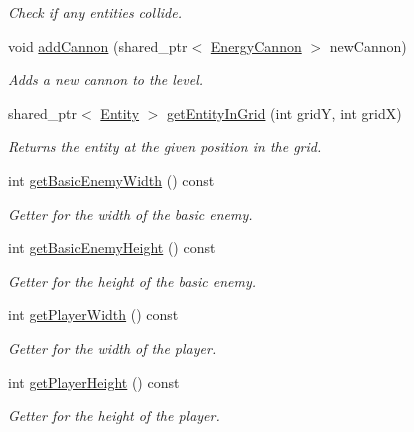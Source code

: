\begin{DoxyCompactItemize}
\begin{DoxyCompactList}\small\item\em Check if any entities collide. \end{DoxyCompactList}\item 
void \hyperlink{classGameLogic_1_1Level_a728ab647770a64be071d4125d7bd5cd6}{add\+Cannon} (shared\+\_\+ptr$<$ \hyperlink{classGameLogic_1_1EnergyCannon}{Energy\+Cannon} $>$ new\+Cannon)
\begin{DoxyCompactList}\small\item\em Adds a new cannon to the level. \end{DoxyCompactList}\item 
shared\+\_\+ptr$<$ \hyperlink{classGameLogic_1_1Entity}{Entity} $>$ \hyperlink{classGameLogic_1_1Level_afbe96c6615ae2df79dd3ce90fcedf83a}{get\+Entity\+In\+Grid} (int gridY, int gridX)
\begin{DoxyCompactList}\small\item\em Returns the entity at the given position in the grid. \end{DoxyCompactList}\item 
int \hyperlink{classGameLogic_1_1Level_a393075a2f768bf13c35ca338d1785694}{get\+Basic\+Enemy\+Width} () const
\begin{DoxyCompactList}\small\item\em Getter for the width of the basic enemy. \end{DoxyCompactList}\item 
int \hyperlink{classGameLogic_1_1Level_a5ff5361f7a4f4ff3ac58c95dfdc2341a}{get\+Basic\+Enemy\+Height} () const
\begin{DoxyCompactList}\small\item\em Getter for the height of the basic enemy. \end{DoxyCompactList}\item 
int \hyperlink{classGameLogic_1_1Level_a3e891e1ebca3e64b0fcf85ec6b50ee44}{get\+Player\+Width} () const
\begin{DoxyCompactList}\small\item\em Getter for the width of the player. \end{DoxyCompactList}\item 
int \hyperlink{classGameLogic_1_1Level_a6fdeff89393edde1156f75ccab640c79}{get\+Player\+Height} () const
\begin{DoxyCompactList}\small\item\em Getter for the height of the player. \end{DoxyCompactList}\item 

\end{DoxyCompactItemize}
